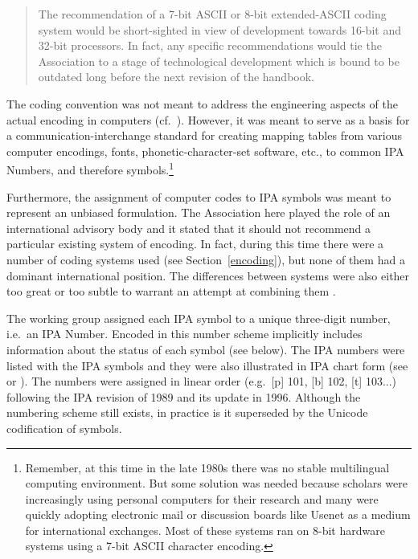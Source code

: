 \begin{quote}
The recommendation of a 7-bit ASCII or 8-bit extended-ASCII coding system 
would be short-sighted in view of development towards 16-bit and 32-bit 
processors. In fact, any specific recommendations would tie the Association 
to a stage of technological development which is bound to be outdated long 
before the next revision of the handbook.
\end{quote}

\noindent The coding convention was not meant to address the engineering 
aspects of the actual encoding in computers (cf.\ \cite{Anderson1984}). However, 
it was meant to serve as a basis for a communication-interchange standard for 
creating mapping tables from various computer encodings, fonts, phonetic-character-set 
software, etc., to common IPA Numbers, and therefore symbols.\footnote{Remember, at 
this time in the late 1980s there was no stable multilingual computing environment. 
But some solution was needed because scholars were increasingly using personal 
computers for their research and many were quickly adopting electronic mail or 
discussion boards like Usenet as a medium for international exchanges. 
Most of these systems ran on 8-bit hardware systems using a 7-bit ASCII character encoding.}

Furthermore, the assignment of computer codes to IPA symbols was meant to
represent an unbiased formulation. The Association here played the role of an
international advisory body and it stated that it should not recommend a
particular existing system of encoding. In fact, during this time there were a
number of coding systems used (see Section~\ref{encoding}), but none of them had
a dominant international position. The differences between systems were also
either too great or too subtle to warrant an attempt at combining them
\citep{International1989report}.

The working group assigned each IPA symbol to a unique three-digit number, i.e.\
an IPA Number. Encoded in this number scheme implicitly includes information
about the status of each symbol (see below). The IPA numbers were listed with the
IPA symbols and they were also illustrated in IPA chart form (see
\cite[84]{EslingGaylord1993} or \cite[App. 2]{IPA2007}). The numbers were
assigned in linear order (e.g.\ [p] 101, [b] 102, [t] 103...) following the IPA
revision of 1989 and its update in 1996. Although the numbering scheme still 
exists, in practice is it superseded by the Unicode codification of symbols.

